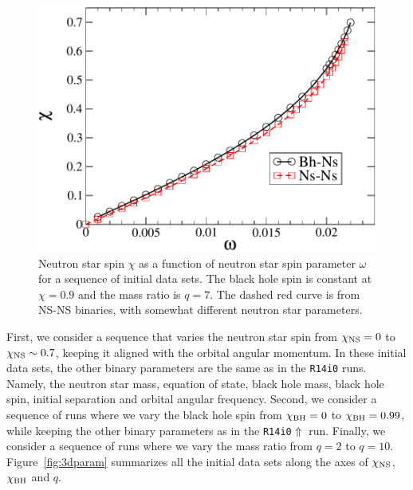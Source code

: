 \begin{figure}
\centerline{\includegraphics[scale=0.95]{chap4/chiVOmega}}
\caption[$\chi_{\rm NS}$ as a function of $\omega_{\rm NS}$ for bh-ns
binaries]
{\label{fig:ChiVOmega}
Neutron star spin $\chi$ as a function of neutron star spin parameter
$\omega$ for a sequence of initial data sets. The black hole spin is
constant at $\chi=0.9$ and the mass ratio is $q=7$. The dashed red curve is
from NS-NS binaries, with somewhat different neutron star parameters.}
\end{figure}

First, we consider a
sequence that varies the neutron star spin from $\chi_{\rm NS}=0$ to
$\chi_{\rm NS}\sim0.7$, keeping it aligned with the orbital angular
momentum. In these initial data sets, the other binary parameters are
the same as in the {\tt R14i0} runs. Namely, the neutron star mass,
equation of state, black hole mass, black hole spin, initial
separation and orbital angular frequency. Second, we consider a
sequence of runs where we vary the black hole spin from $\chi_{\rm
  BH}=0$ to $\chi_{\rm BH}=0.99$, while keeping the other binary
parameters as in the {\tt R14i0$\Uparrow$} run. Finally, we consider
a sequence of runs where we vary the mass ratio from $q=2$ to $q=10$.
Figure~\ref{fig:3dparam} summarizes all the initial data sets along
the axes of $\chi_{\rm NS}$, $\chi_{\rm BH}$ and $q$.


